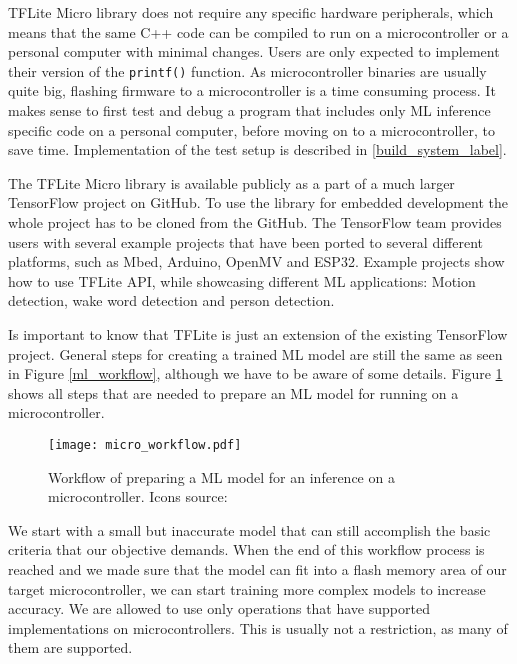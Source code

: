 TFLite Micro library does not require any specific hardware peripherals, which means that the same C++ code can be compiled to run on a microcontroller or a personal computer with minimal changes.
Users are only expected to implement their version of the \verb|printf()| function.
As microcontroller binaries are usually quite big, flashing firmware to a microcontroller is a time consuming process.
It makes sense to first test and debug a program that includes only ML inference specific code on a personal computer, before moving on to a microcontroller, to save time.
Implementation of the test setup is described in \ref{build_system_label}.

The TFLite Micro library is available publicly as a part of a much larger TensorFlow project on GitHub\cite{tensorflow_github}.
To use the library for embedded development the whole project has to be cloned from the GitHub.
The TensorFlow team provides users with several example projects that have been ported to several different platforms, such as Mbed, Arduino, OpenMV and ESP32.
Example projects show how to use TFLite API, while showcasing different ML applications: Motion detection, wake word detection and person detection.

Is important to know that TFLite is just an extension of the existing TensorFlow project.
General steps for creating a trained ML model are still the same as seen in Figure \ref{ml_workflow}, although we have to be aware of some details.
Figure \ref{micro_workflow} shows all steps that are needed to prepare an ML model for running on a microcontroller.

\begin{figure}[ht] 
    \centering
    \texttt{[image: micro\_workflow.pdf]} 
    \caption[Workflow of preparing an ML model for an inference on a microcontroller.]{Workflow of preparing a ML model for an inference on a microcontroller. Icons source:\cite{icons}}
    \label{micro_workflow}
\end{figure}

We start with a small but inaccurate model that can still accomplish the basic criteria that our objective demands.
When the end of this workflow process is reached and we made sure that the model can fit into a flash memory area of our target microcontroller, we can start training more complex models to increase accuracy.
We are allowed to use only operations that have supported implementations on microcontrollers.
This is usually not a restriction, as many of them are supported.

